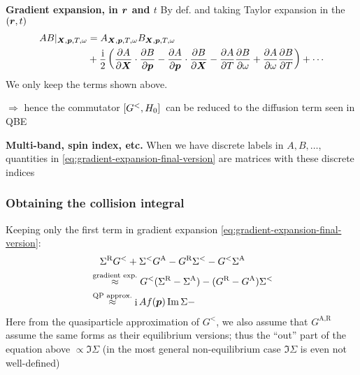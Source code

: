 \documentclass[t]{beamer}
\DeclareMathOperator{\ii}{i}
\begin{document}
\begin{frame}[allowframebreaks]
\textbf{Gradient expansion, in $\vb*{r}$ and $t$} 
By def. and taking Taylor expansion in the $(\vb*{r}, t)$
\begin{equation}
    \begin{aligned}
        AB|_{\vb*{X}, \vb*{p}, T, \omega} &= A_{\vb*{X}, \vb*{p}, T, \omega} B_{\vb*{X}, \vb*{p}, T, \omega} \\
        &+ \frac{\ii}{2} \left(
            \pdv{A}{\vb*{X}} \cdot \pdv{B}{\vb*{p}}
            - \pdv{A}{\vb*{p}} \cdot \pdv{B}{\vb*{X}}
            - \pdv{A}{T} \pdv{B}{\omega}
            + \pdv{A}{\omega} \pdv{B}{T}
        \right) + \cdots
    \end{aligned}
    \label{eq:gradient-expansion-final-version}
\end{equation}
We only keep the terms shown above. 

$\Rightarrow$ hence the commutator $\comm*{G^<}{H_0}$ can be reduced to the diffusion term seen in QBE

\vspace{0.25cm}

\textbf{Multi-band, spin index, etc.} When we have discrete labels in $A, B, \dots$,
quantities in \eqref{eq:gradient-expansion-final-version} 
are matrices with these discrete indices

\end{frame}

\begin{frame}
\frametitle{Obtaining the collision integral}

Keeping only the first term in gradient expansion \eqref{eq:gradient-expansion-final-version}:
\begin{equation}
    \begin{aligned}
        &\quad \Sigma^{\text{R}} G^< + \Sigma^< G^{\text{A}} - G^{\text{R}} \Sigma^< - G^< \Sigma^{\text{A}}\\
        &\stackrel{\text{gradient exp.}}{\approx} G^<(\Sigma^{\text{R}} - \Sigma^{\text{A}}) 
        - (G^{\text{R}} - G^{\text{A}}) \Sigma^< \\
        &\stackrel{\text{QP approx.}}{\approx} \ii A f (\vb*{p}) \Im \Sigma
        - 
    \end{aligned}
\end{equation}    
Here from the quasiparticle approximation of $G^<$,
we also assume that $G^{\text{A}, \text{R}}$ assume 
the same forms as their equilibrium versions;
thus the ``out'' part of the equation above $\propto \Im \Sigma$
(in the most general non-equilibrium case $\Im \Sigma$ is even not well-defined)


\end{frame}
\end{document}
